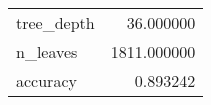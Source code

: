 \begin{tabular}{lr}
\toprule
 &  \\
\midrule
tree\_depth & 36.000000 \\
n\_leaves & 1811.000000 \\
accuracy & 0.893242 \\
\bottomrule
\end{tabular}